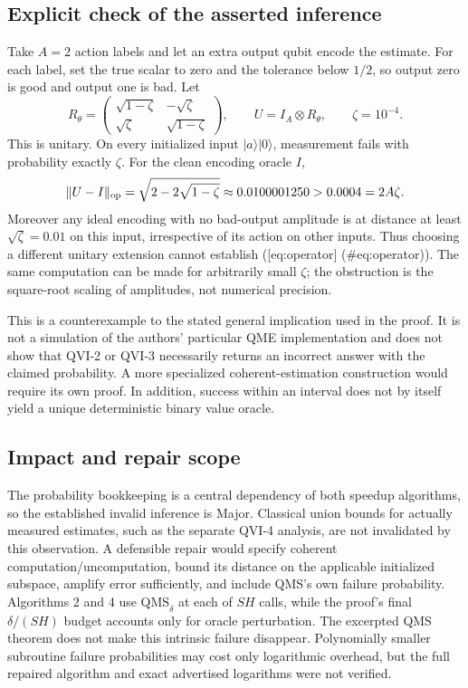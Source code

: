 \documentclass[10pt]{article}
\begin{document}
\subsection*{Explicit check of the asserted inference}
Take \(A=2\) action labels and let an extra output qubit encode the estimate. For each label, set the true scalar to zero and the tolerance below \(1/2\), so output zero is good and output one is bad. Let \[R_\theta=\begin{pmatrix}\sqrt{1-\zeta}&-\sqrt\zeta\\
\sqrt\zeta&\sqrt{1-\zeta}\end{pmatrix},\qquad
U=I_A\otimes R_\theta,\qquad \zeta=10^{-4}.\] This is unitary. On every initialized input \(|a\rangle|0\rangle\), measurement fails with probability exactly \(\zeta\). For the clean encoding oracle \(I\), \[\|U-I\|_{\rm op}=\sqrt{2-2\sqrt{1-\zeta}}
 \approx0.0100001250>0.0004=2A\zeta.\] Moreover any ideal encoding with no bad-output amplitude is at distance at least \(\sqrt\zeta=0.01\) on this input, irrespective of its action on other inputs. Thus choosing a different unitary extension cannot establish ([eq:operator] (\#eq:operator)). The same computation can be made for arbitrarily small \(\zeta\); the obstruction is the square-root scaling of amplitudes, not numerical precision.\par
This is a counterexample to the stated general implication used in the proof. It is not a simulation of the authors’ particular QME implementation and does not show that QVI-2 or QVI-3 necessarily returns an incorrect answer with the claimed probability. A more specialized coherent-estimation construction would require its own proof. In addition, success within an interval does not by itself yield a unique deterministic binary value oracle.\par
\subsection*{Impact and repair scope}
The probability bookkeeping is a central dependency of both speedup algorithms, so the established invalid inference is Major. Classical union bounds for actually measured estimates, such as the separate QVI-4 analysis, are not invalidated by this observation. A defensible repair would specify coherent computation/uncomputation, bound its distance on the applicable initialized subspace, amplify error sufficiently, and include QMS’s own failure probability. Algorithms 2 and 4 use \(\mathrm{QMS}_{\delta}\) at each of \(SH\) calls, while the proof’s final \(\delta/(SH)\) budget accounts only for oracle perturbation. The excerpted QMS theorem does not make this intrinsic failure disappear. Polynomially smaller subroutine failure probabilities may cost only logarithmic overhead, but the full repaired algorithm and exact advertised logarithms were not verified.\par
\end{document}

